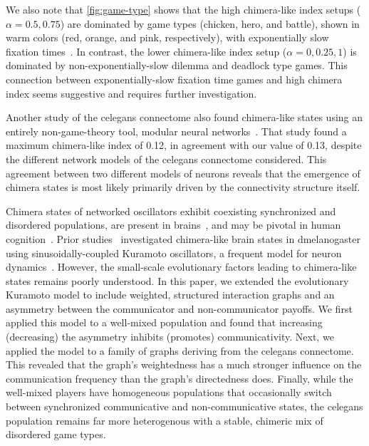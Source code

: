 \documentclass[pdflatex,twocolumn,sn-nature,super]{sn-jnl}
\begin{document}
We also note that \cref{fig:game-type} shows that
the high chimera-like index setups ($\alpha = 0.5, 0.75$)
are dominated by game types (chicken, hero, and battle),
shown in warm colors (red, orange, and pink, respectively),
with exponentially slow fixation times~\citep{antal2006fixation}.
In contrast, the lower chimera-like index setup ($\alpha = 0,0.25,1$)
is dominated by non-exponentially-slow dilemma and deadlock type games.
This connection between exponentially-slow fixation time games and high chimera index
seems suggestive and requires further investigation.

Another study of the \gls{celegans} connectome also found
chimera-like states using an entirely non-game-theory tool,
modular neural networks~\citep{hizanidis2016chimera}.
That study found a maximum chimera-like index of \num{0.12},
in agreement with our value of \num{0.13}, despite the different network models
of the \gls{celegans} connectome considered.
This agreement between two different models of neurons
reveals that the emergence of chimera states
is most likely primarily driven by the connectivity structure itself.

Chimera states of networked oscillators
exhibit coexisting
synchronized and disordered populations,
are present
in brains~\citep{santos2017chimera,bansal2019cognitive},
and may be pivotal in human cognition~\citep{bansal2019cognitive}.
Prior studies~\citep{deng2024chimera} investigated
chimera-like brain states in \gls{dmelanogaster}
using sinusoidally-coupled Kuramoto oscillators,
a frequent model for neuron dynamics~\citep{cabral2011role}.
However, the small-scale evolutionary factors
leading to chimera-like states remains poorly understood.
In this paper, we extended the evolutionary Kuramoto model
to include weighted, structured interaction graphs
and an asymmetry between
the communicator and non-communicator payoffs.
We first applied this model to a well-mixed population
and found that increasing (decreasing) the asymmetry
inhibits (promotes) communicativity.
Next, we applied the model to
a family of graphs deriving from the \gls{celegans} connectome.
This revealed that the graph's weightedness
has a much stronger influence on the communication frequency
than the graph's directedness does.
Finally, while the well-mixed players have homogeneous populations
that occasionally switch between synchronized communicative
and  non-communicative states,
the \gls{celegans} population remains far more heterogenous
with a stable, chimeric mix of disordered game types.
\end{document}
